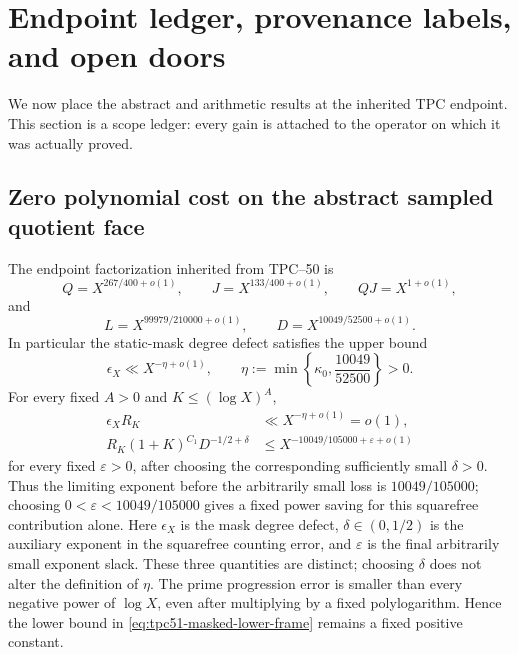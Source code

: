 \section{Endpoint ledger, provenance labels, and open doors}
\label{sec:tpc51-endpoint}

We now place the abstract and arithmetic results at the inherited TPC
endpoint.  This section is a scope ledger: every gain is attached to
the operator on which it was actually proved.

\subsection{Zero polynomial cost on the abstract sampled quotient face}

The endpoint factorization inherited from TPC--50 is
\begin{equation}
 Q=X^{267/400+o(1)},
 \qquad J=X^{133/400+o(1)},
 \qquad QJ=X^{1+o(1)},
 \label{eq:tpc51-endpoint-QJ}
\end{equation}
and
\begin{equation}
 L=X^{99979/210000+o(1)},
 \qquad
 D=X^{10049/52500+o(1)}.
 \label{eq:tpc51-endpoint-LD}
\end{equation}
In particular the static-mask degree defect satisfies the upper bound
\begin{equation}
 \epsilon_X\ll X^{-\eta+o(1)},
 \qquad
 \eta:=\min\left\{\kappa_0,\frac{10049}{52500}\right\}>0.
 \label{eq:tpc51-endpoint-epsilon}
\end{equation}
For every fixed \(A>0\) and \(K\leq(\log X)^A\),
\begin{align}
 \epsilon_XR_K
 &\ll X^{-\eta+o(1)}=o(1),
 \label{eq:tpc51-endpoint-mask-loss}\\
 R_K(1+K)^{C_1}D^{-1/2+\delta}
 &\leq X^{-10049/105000+\varepsilon+o(1)}
 \label{eq:tpc51-endpoint-squarefree-loss}
\end{align}
for every fixed \(\varepsilon>0\), after choosing the corresponding
sufficiently small \(\delta>0\).  Thus the limiting exponent before the
arbitrarily small loss is \(10049/105000\); choosing
\(0<\varepsilon<10049/105000\) gives a fixed power saving for this
squarefree contribution alone.
Here \(\epsilon_X\) is the mask degree defect, \(\delta\in(0,1/2)\)
is the auxiliary exponent in the squarefree counting error, and
\(\varepsilon\) is the final arbitrarily small exponent slack.  These
three quantities are distinct; choosing \(\delta\) does not alter the
definition of \(\eta\).  The prime progression error is
smaller than every negative power of \(\log X\), even after multiplying
by a fixed polylogarithm.  Hence the lower bound in
\eqref{eq:tpc51-masked-lower-frame} remains a fixed positive constant.


